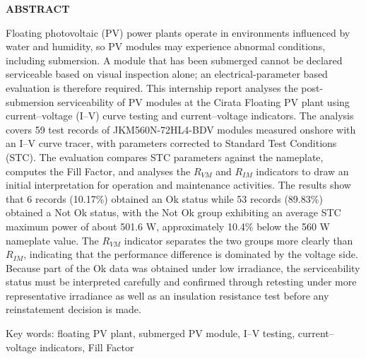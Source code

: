 
\clearpage
{}
{}
\begin{center}
    \textbf{ABSTRACT}\\[0.5cm]
\end{center}

Floating photovoltaic (PV) power plants operate in environments influenced by
water and humidity, so PV modules may experience abnormal conditions,
including submersion. A module that has been submerged cannot be declared
serviceable based on visual inspection alone; an electrical-parameter based
evaluation is therefore required. This internship report analyses the
post-submersion serviceability of PV modules at the Cirata Floating PV plant
using current--voltage (I--V) curve testing and current--voltage indicators.
The analysis covers 59 test records of JKM560N-72HL4-BDV modules measured
onshore with an I--V curve tracer, with parameters corrected to Standard Test
Conditions (STC). The evaluation compares STC parameters against the nameplate,
computes the Fill Factor, and analyses the $R_{VM}$ and $R_{IM}$ indicators to
draw an initial interpretation for operation and maintenance activities. The
results show that 6 records (10.17\%) obtained an Ok status while 53 records
(89.83\%) obtained a Not Ok status, with the Not Ok group exhibiting an average
STC maximum power of about 501.6 W, approximately 10.4\% below the 560 W
nameplate value. The $R_{VM}$ indicator separates the two groups more clearly
than $R_{IM}$, indicating that the performance difference is dominated by the
voltage side. Because part of the Ok data was obtained under low irradiance,
the serviceability status must be interpreted carefully and confirmed through
retesting under more representative irradiance as well as an insulation
resistance test before any reinstatement decision is made.

\vspace{1em}
\noindent Key words: floating PV plant, submerged PV module, I--V testing,
current--voltage indicators, Fill Factor


